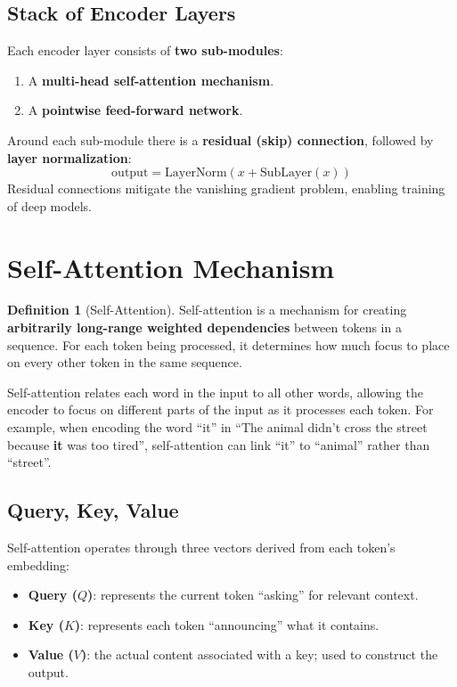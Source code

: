 \documentclass[11pt,a4paper]{article}
\theoremstyle{definition}
\newtheorem{definition}{Definition}[section]
\theoremstyle{plain}
\theoremstyle{remark}
\begin{document}
\subsection{Stack of Encoder Layers}

Each encoder layer consists of \textbf{two sub-modules}:
\begin{enumerate}
    \item A \textbf{multi-head self-attention mechanism}.
    \item A \textbf{pointwise feed-forward network}.
\end{enumerate}
Around each sub-module there is a \textbf{residual (skip) connection}, followed by \textbf{layer normalization}:
\[
    \text{output} = \mathrm{LayerNorm}(x + \mathrm{SubLayer}(x))
\]
Residual connections mitigate the vanishing gradient problem, enabling training of deep models.


\section{Self-Attention Mechanism}

\begin{definition}[Self-Attention]
Self-attention is a mechanism for creating \textbf{arbitrarily long-range weighted dependencies} between tokens in a sequence. For each token being processed, it determines how much focus to place on every other token in the same sequence.
\end{definition}

Self-attention relates each word in the input to all other words, allowing the encoder to focus on different parts of the input as it processes each token. For example, when encoding the word ``it'' in ``The animal didn't cross the street because \textbf{it} was too tired'', self-attention can link ``it'' to ``animal'' rather than ``street''.

\subsection{Query, Key, Value}

Self-attention operates through three vectors derived from each token's embedding:

\begin{itemize}
    \item \textbf{Query ($Q$)}: represents the current token ``asking'' for relevant context.
    \item \textbf{Key ($K$)}: represents each token ``announcing'' what it contains.
    \item \textbf{Value ($V$)}: the actual content associated with a key; used to construct the output.
\end{itemize}
\end{document}
